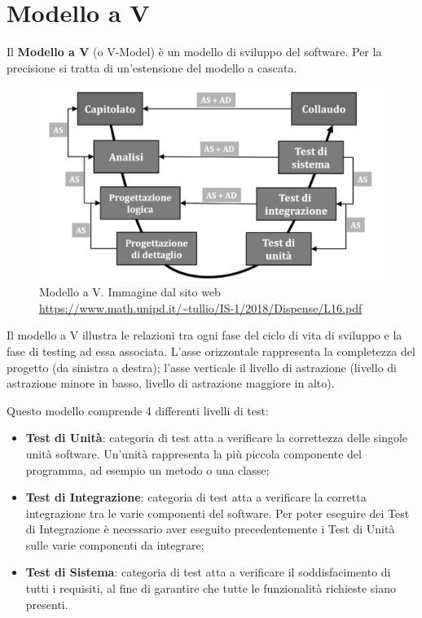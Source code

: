 \section{Modello a V}
\label{modelloV}

Il \textbf{Modello a V} (o V-Model) è un modello di sviluppo del software. Per la precisione si tratta di un'estensione del modello a cascata. 

\begin{figure}[H]
\centering
	\includegraphics[width=0.7\linewidth]{./images/modellov.jpg} 
	\caption{Modello a V. Immagine dal sito web \url{https://www.math.unipd.it/~tullio/IS-1/2018/Dispense/L16.pdf}}
	\label{vmodel}
\end{figure}

Il modello a V illustra le relazioni tra ogni fase del ciclo di vita di sviluppo e la fase di testing ad essa associata. L'asse orizzontale rappresenta la completezza del progetto (da sinistra a destra); l'asse verticale il livello di astrazione (livello di astrazione minore in basso, livello di astrazione maggiore in alto).

Questo modello comprende 4 differenti livelli di test: 
\begin{itemize}
	\item \textbf{Test di Unità}: categoria di test atta a verificare la correttezza delle singole unità software. Un'unità rappresenta la più piccola componente del programma, ad esempio un metodo o una classe;
	\item \textbf{Test di Integrazione}: categoria di test atta a verificare la corretta integrazione tra le varie componenti del software. Per poter eseguire dei Test di Integrazione è necessario aver eseguito precedentemente i Test di Unità sulle varie componenti da integrare;
	\item \textbf{Test di Sistema}: categoria di test atta a verificare il soddisfacimento di tutti i requisiti, al fine di garantire che tutte le funzionalità richieste siano presenti.
\end{itemize}

